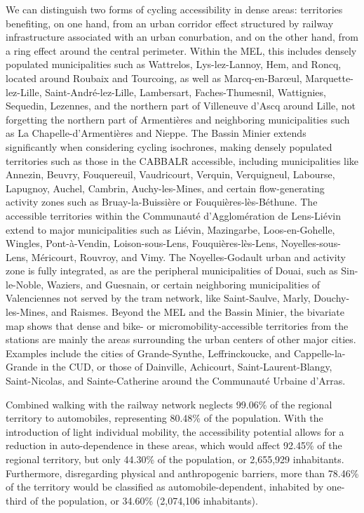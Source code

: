 \begin{refsegment}
We can distinguish two forms of cycling accessibility in dense areas: territories benefiting, on one hand, from an urban corridor effect \textcolor{blue}{\autocite[63-65]{liu_corridors_2016}} structured by railway infrastructure associated with an urban conurbation, and on the other hand, from a ring effect around the central perimeter. Within the \acrfull{MEL}, this includes densely populated municipalities such as Wattrelos, Lys-lez-Lannoy, Hem, and Roncq, located around Roubaix and Tourcoing, as well as Marcq-en-Barœul, Marquette-lez-Lille, Saint-André-lez-Lille, Lambersart, Faches-Thumesnil, Wattignies, Sequedin, Lezennes, and the northern part of Villeneuve d'Ascq around Lille, not forgetting the northern part of Armentières and neighboring municipalities such as La Chapelle-d'Armentières and Nieppe. The Bassin Minier extends significantly when considering cycling isochrones, making densely populated territories such as those in the \acrfull{CABBALR} accessible, including municipalities like Annezin, Beuvry, Fouquereuil, Vaudricourt, Verquin, Verquigneul, Labourse, Lapugnoy, Auchel, Cambrin, Auchy-les-Mines, and certain flow-generating activity zones such as Bruay-la-Buissière or Fouquières-lès-Béthune. The accessible territories within the Communauté d'Agglomération de Lens-Liévin extend to major municipalities such as Liévin, Mazingarbe, Loos-en-Gohelle, Wingles, Pont-à-Vendin, Loison-sous-Lens, Fouquières-lès-Lens, Noyelles-sous-Lens, Méricourt, Rouvroy, and Vimy. The Noyelles-Godault urban and activity zone is fully integrated, as are the peripheral municipalities of Douai, such as Sin-le-Noble, Waziers, and Guesnain, or certain neighboring municipalities of Valenciennes not served by the tram network, like Saint-Saulve, Marly, Douchy-les-Mines, and Raismes. Beyond the \acrshort{MEL} and the Bassin Minier, the bivariate map shows that dense and bike- or micromobility-accessible territories from the stations are mainly the areas surrounding the urban centers of other major cities. Examples include the cities of Grande-Synthe, Leffrinckoucke, and Cappelle-la-Grande in the \acrfull{CUD}, or those of Dainville, Achicourt, Saint-Laurent-Blangy, Saint-Nicolas, and Sainte-Catherine around the Communauté Urbaine d'Arras.%

Combined walking with the railway network neglects 99.06\% of the regional territory to automobiles, representing 80.48\% of the population. With the introduction of light individual mobility, the accessibility potential allows for a reduction in auto-dependence in these areas, which would affect 92.45\% of the regional territory, but only 44.30\% of the population, or 2,655,929 inhabitants. Furthermore, disregarding physical and anthropogenic barriers, more than 78.46\% of the territory would be classified as automobile-dependent, inhabited by one-third of the population, or 34.60\% (2,074,106 inhabitants).%


\end{refsegment}
